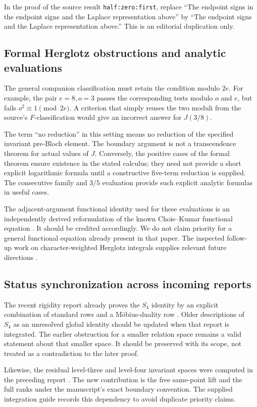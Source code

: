 In the proof of the source result \texttt{half:zero:first}, replace
``The endpoint signs in the endpoint signs and the Laplace representation
above'' by ``The endpoint signs and the Laplace representation above.''
This is an editorial duplication only.

\subsection{Formal Herglotz obstructions and analytic evaluations}

The general companion classification must retain the condition modulo
$2e$. For example, the pair $e=8,o=3$ passes the corresponding tests
modulo $o$ and $e$, but fails $o^2\equiv1\pmod{2e}$. A criterion that
simply reuses the two moduli from the source's $F$-classification would
give an incorrect answer for $J(3/8)$.

The term ``no reduction'' in this setting means no reduction of the
specified invariant pre-Bloch element. The boundary argument is not
a transcendence theorem for actual values of $J$. Conversely, the
positive cases of the formal theorem ensure existence in the stated
calculus; they need not provide a short explicit logarithmic formula
until a constructive five-term reduction is supplied. The consecutive
family and $3/5$ evaluation provide such explicit analytic formulas
in useful cases.

The adjacent-argument functional identity used for these evaluations
is an independently derived reformulation of the known Choie--Kumar
functional equation \cite[Theorem 3.2(1)]{ChoieKumar2023}. It should be
credited accordingly. We do not claim priority for a general functional
equation already present in that paper. The inspected follow-up work
on character-weighted Herglotz integrals supplies relevant future
directions \cite{DixitSathyanarayanaSharan2024}.

\subsection{Status synchronization across incoming reports}

The recent rigidity report already proves the $S_4$ identity by an
explicit combination of standard rows and a Möbius-duality row
\cite{PriorRigidity}. Older descriptions of $S_4$ as an unresolved
global identity should be updated when that report is integrated.
The earlier obstruction for a smaller relation space remains a valid
statement about that smaller space. It should be preserved with its
scope, not treated as a contradiction to the later proof.

Likewise, the residual level-three and level-four invariant spaces
were computed in the preceding report \cite{PriorResearch}. The
new contribution is the free same-point lift and the full ranks under
the manuscript's exact boundary convention. The supplied integration
guide records this dependency to avoid duplicate priority claims.
